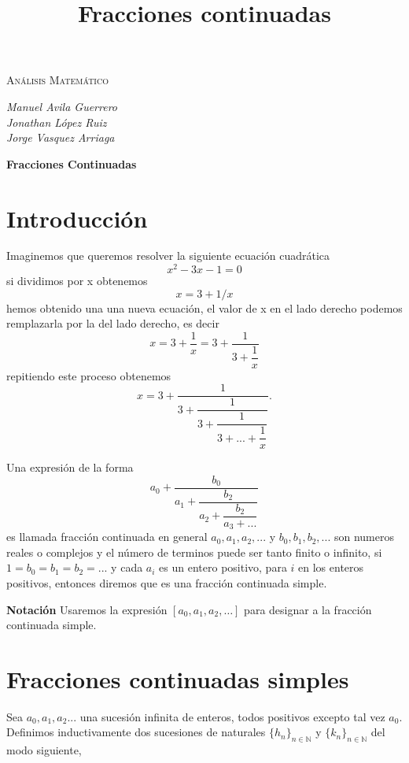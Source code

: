 \documentclass[11pt, article]{article}
\title{Fracciones continuadas}
\author{}
\date{}
\begin{document}
    \begin{center}
    {\scshape\LARGE Análisis Matemático \par}

    \vspace{0.5cm}
    \large{\itshape{Manuel Avila Guerrero}}  \\ 
    \large{\itshape{Jonathan López Ruiz}}  \\
    \large{\itshape{Jorge Vasquez Arriaga}} \\

    {\LARGE \textbf{Fracciones Continuadas} \par}
    \end{center}


\section*{Introducción}
    Imaginemos que queremos resolver la siguiente ecuación cuadrática 
        \[
        x^2 -3x-1=0
        \]
    si dividimos por x obtenemos 
        \[
        x = 3 + 1/x
        \]
    hemos obtenido una una nueva ecuación, el valor de x en el lado derecho podemos remplazarla por la del lado derecho, es decir 
    \[
    x=3+\dfrac{1}{x}=3+\dfrac{1}{3+\dfrac{1}{x}}
    \]
    repitiendo este proceso obtenemos
    \[
    x=3+\dfrac{1}{3 + \dfrac{1}{3 + \dfrac{1}{3 + ... + \dfrac{1}{x}}}}.
    \]
    
    Una expresión de la forma 
    \[
    a_0 + \dfrac{b_0}{a_1+ \dfrac{b_2}{a_2+\dfrac{b_2}{a_3+...}}} 
    \]
    es llamada fracción continuada en general $a_0, a_1,a_2,...$ y $b_0, b_1,b_2,...$ son numeros reales o complejos y el número de terminos puede ser tanto finito o infinito, si $1=b_0=b_1=b_2=...$ y cada $a_i$ es un entero positivo, para $i$ en los enteros positivos, entonces diremos que es una fracción continuada simple.
    
    \textbf{Notación} Usaremos la expresión $[a_0,a_1,a_2, \dots]$ para designar a la fracción continuada simple.
    
\section*{Fracciones continuadas simples}
    
    
    Sea $a_0,a_1,a_2...$ una sucesión infinita de enteros, todos positivos excepto tal vez $a_0$. Definimos inductivamente dos sucesiones de naturales $\{h_n\}_{n\in\mathbb{N}}$ y $\{k_n\}_{n\in\mathbb{N}}$ del modo siguiente,
    
\end{document}
